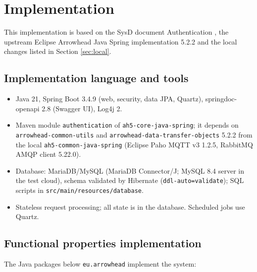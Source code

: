 \documentclass[a4paper]{arrowhead}
\begin{document}
\section{Implementation}
\label{Implementation}

This implementation is based on the SysD document Authentication \cite{auth-sysd}, the upstream Eclipse Arrowhead Java Spring implementation 5.2.2 \cite{ah5java} and the local changes listed in Section \ref{sec:local}.

\subsection{Implementation language and tools}
\begin{itemize}
\item Java 21, Spring Boot 3.4.9 (web, security, data JPA, Quartz), springdoc-openapi 2.8 (Swagger UI), Log4j 2.
\item Maven module \texttt{authentication} of \texttt{ah5-core-java-spring}; it depends on \texttt{arrowhead-common-utils} and \texttt{arrowhead-data-transfer-objects} 5.2.2 from the local \texttt{ah5-common-java-spring} (Eclipse Paho MQTT v3 1.2.5, RabbitMQ AMQP client 5.22.0).
\item Database: MariaDB/MySQL (MariaDB Connector/J; MySQL 8.4 server in the test cloud), schema validated by Hibernate (\texttt{ddl-auto=validate}); SQL scripts in \texttt{src/main/resources/database}.
\item Stateless request processing; all state is in the database. Scheduled jobs use Quartz.
\end{itemize}

\subsection{Functional properties implementation}

The Java packages below \texttt{eu.arrowhead} implement the system:
\end{document}
